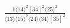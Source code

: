 \documentclass[varwidth, border=5pt]{standalone}
\begin{document}
\begin{my}
$\begin{gathered}
\scriptscriptstyle\frac{1⟨14⟩^2[34]^2⟨25⟩^2}{⟨13⟩⟨15⟩^2⟨24⟩⟨34⟩[35]^2}
\end{gathered}$
\end{my}
\end{document}
